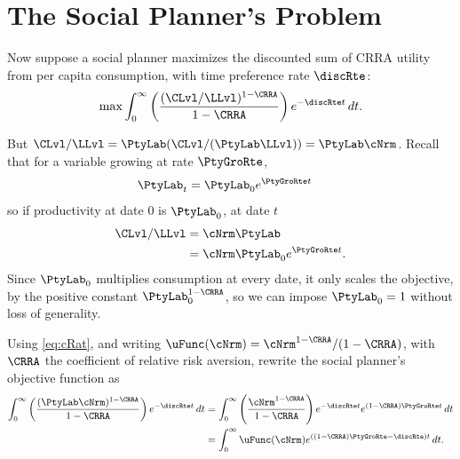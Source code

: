 \documentclass{econark}
\begin{document}
\section{The Social Planner's Problem}

Now suppose a social planner maximizes the discounted
sum of CRRA utility from per capita consumption, with time preference rate $\discRte$:
\begin{equation}
  \max \int_{0}^{\infty} \left(\frac{(\CLvl/\LLvl)^{1-\CRRA}}{1-\CRRA}\right) e^{-\discRte  t}\,dt . \label{eq:RCK-maxprob}
\end{equation}

But $\CLvl/\LLvl = \PtyLab (\CLvl/(\PtyLab \LLvl))= \PtyLab \cNrm$.  Recall that for a variable growing at rate $\PtyGroRte$,
\begin{equation}\begin{gathered}\begin{aligned}
  \PtyLab _{t} & =  \PtyLab _{0}e^{\PtyGroRte t}
\end{aligned}\end{gathered}\end{equation}
so if productivity at date 0 is $\PtyLab_{0}$, at date $t$
\begin{equation}\begin{gathered}\begin{aligned}
  \CLvl/\LLvl & =  \cNrm\PtyLab   \\
               & =  \cNrm\PtyLab _{0}e^{\PtyGroRte t}. \label{eq:cRat}
\end{aligned}\end{gathered}\end{equation}
Since $\PtyLab_{0}$ multiplies consumption at every date, it only scales the objective, by the positive constant $\PtyLab_{0}^{1-\CRRA}$, so we can impose $\PtyLab_{0}=1$ without loss of generality.

Using \eqref{eq:cRat}, and writing $\uFunc(\cNrm) = \cNrm^{1-\CRRA}/(1-\CRRA)$, with $\CRRA$ the coefficient of relative risk aversion, rewrite the social planner's objective function as
\begin{equation}\begin{gathered}\begin{aligned}
  \int_{0}^{\infty} \left(\frac{(\PtyLab \cNrm)^{1-\CRRA}}{1-\CRRA}\right) e^{-\discRte  t}\,dt & =
  \int_{0}^{\infty} \left(\frac{\cNrm^{1-\CRRA}}{1-\CRRA}\right) e^{-\discRte  t}e^{(1-\CRRA)\PtyGroRte  t}\,dt
  \\ & =  \int_{0}^{\infty} \uFunc(\cNrm) e^{\left((1-\CRRA)\PtyGroRte -\discRte \right) t}\,dt
           .
           \label{eq:maxprobmod}
\end{aligned}\end{gathered}\end{equation}
\end{document}
